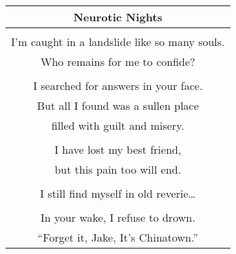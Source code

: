 \documentclass{article}
\begin{document}
\begin{center}
\begin{tabular}{c}
\textbf{Neurotic Nights} \\ \hline
\\
I'm caught in a landslide like so many souls. \\
Who remains for me to confide? \\
\\
I searched for answers in your face. \\
But all I found was a sullen place \\
filled with guilt and misery. \\
\\
I have lost my best friend, \\
but this pain too will end. \\
\\
I still find myself in old reverie\ldots \\
\\
In your wake, I refuse to drown. \\
``Forget it, Jake, It's Chinatown.'' \\
\end{tabular}
\end{center}
\end{document}
